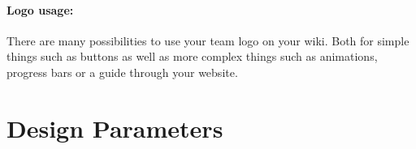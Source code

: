
\paragraph{Logo usage:} There are many possibilities to use your team logo on your wiki.
Both for simple things such as buttons as well as more complex things such as animations, progress bars or a guide through your website.


\section{Design Parameters} \label{sec:design-paramaters} 
